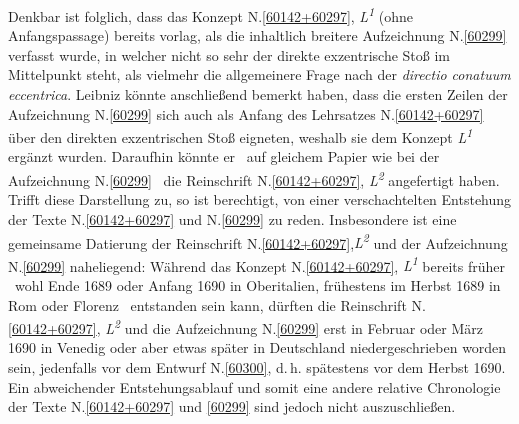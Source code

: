 Denkbar ist folglich, dass das Konzept N.\;\ref{60142+60297}, \textit{L\textsuperscript{1}} (ohne Anfangspassage) bereits vorlag, als  die inhaltlich breitere Aufzeichnung N.\;\ref{60299} verfasst wurde, in welcher nicht so sehr der direkte exzentrische Stoß im Mittelpunkt steht, als vielmehr die allgemeinere Frage nach der \textit{directio conatuum eccentrica}.
Leibniz könnte anschließend bemerkt haben, dass die ersten Zeilen der Aufzeichnung N.\;\ref{60299} sich auch als Anfang des %
Lehrsatzes N.\;\ref{60142+60297} über den direkten exzentrischen Stoß eigneten, weshalb sie dem Konzept \textit{L\textsuperscript{1}} ergänzt wurden.
Daraufhin könnte er \textendash\ auf gleichem Papier wie bei der Aufzeichnung N.\;\ref{60299} \textendash\ die Reinschrift N.\;\ref{60142+60297}, \textit{L\textsuperscript{2}} angefertigt haben.
Trifft diese Darstellung zu, so ist berechtigt, von einer verschachtelten Entstehung der Texte N.\;\ref{60142+60297} und N.\;\ref{60299} zu reden.
Insbesondere ist eine gemeinsame Datierung der Reinschrift N.\;\ref{60142+60297},\;\textit{L\textsuperscript{2}} und der Aufzeichnung N.\;\ref{60299} naheliegend:
Während das Konzept N.\;\ref{60142+60297}, \textit{L\textsuperscript{1}} bereits früher \textendash\ wohl Ende 1689 oder Anfang 1690 in Oberitalien, frühestens im Herbst 1689 in Rom oder Florenz \textendash\ entstanden sein kann, dürften die Reinschrift N.\;\ref{60142+60297}, \textit{L\textsuperscript{2}} und die Aufzeichnung N.\;\ref{60299} erst in Februar oder März 1690 in Venedig oder aber etwas später in Deutschland niedergeschrieben worden sein, jedenfalls vor dem Entwurf N.\;\ref{60300}, d.\,h. spätestens vor dem Herbst 1690.
Ein abweichender Entstehungsablauf und somit eine andere relative Chronologie der Texte N.\;\ref{60142+60297} und \ref{60299} sind jedoch nicht auszuschließen.
\pend%
%
\frenchspacing%
\normalsize%
